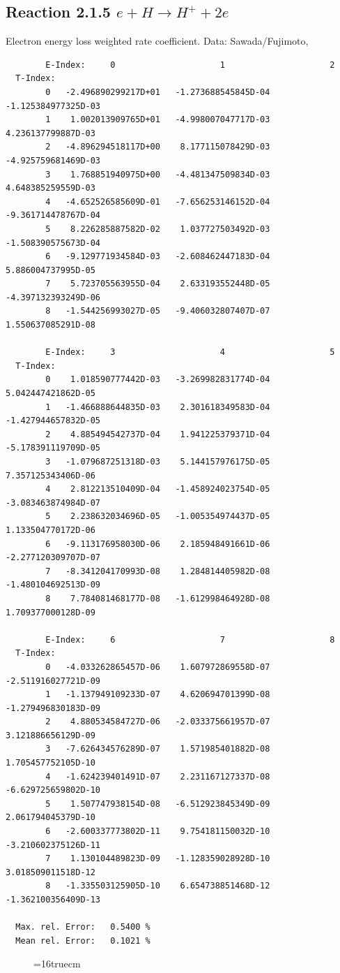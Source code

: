 \documentclass[12pt,dvips]{article}
\begin{document}
\subsection{
Reaction 2.1.5  $ e + H \rightarrow H^+ + 2e $
}
Electron energy loss weighted rate coefficient. Data: Sawada/Fujimoto, \cite{kn:Sawada}

\begin{small}\begin{verbatim}
        E-Index:     0                     1                     2
  T-Index:
        0   -2.496890299217D+01   -1.273688545845D-04   -1.125384977325D-03
        1    1.002013909765D+01   -4.998007047717D-03    4.236137799887D-03
        2   -4.896294518117D+00    8.177115078429D-03   -4.925759681469D-03
        3    1.768851940975D+00   -4.481347509834D-03    4.648385259559D-03
        4   -4.652526585609D-01   -7.656253146152D-04   -9.361714478767D-04
        5    8.226285887582D-02    1.037727503492D-03   -1.508390575673D-04
        6   -9.129771934584D-03   -2.608462447183D-04    5.886004737995D-05
        7    5.723705563955D-04    2.633193552448D-05   -4.397132393249D-06
        8   -1.544256993027D-05   -9.406032807407D-07    1.550637085291D-08

        E-Index:     3                     4                     5
  T-Index:
        0    1.018590777442D-03   -3.269982831774D-04    5.042447421862D-05
        1   -1.466888644835D-03    2.301618349583D-04   -1.427944657832D-05
        2    4.885494542737D-04    1.941225379371D-04   -5.178391119709D-05
        3   -1.079687251318D-03    5.144157976175D-05    7.357125343406D-06
        4    2.812213510409D-04   -1.458924023754D-05   -3.083463874984D-07
        5    2.238632034696D-05   -1.005354974437D-05    1.133504770172D-06
        6   -9.113176958030D-06    2.185948491661D-06   -2.277120309707D-07
        7   -8.341204170993D-08    1.284814405982D-08   -1.480104692513D-09
        8    7.784081468177D-08   -1.612998464928D-08    1.709377000128D-09

        E-Index:     6                     7                     8
  T-Index:
        0   -4.033262865457D-06    1.607972869558D-07   -2.511916027721D-09
        1   -1.137949109233D-07    4.620694701399D-08   -1.279496830183D-09
        2    4.880534584727D-06   -2.033375661957D-07    3.121886656129D-09
        3   -7.626434576289D-07    1.571985401882D-08    1.705457752105D-10
        4   -1.624239401491D-07    2.231167127337D-08   -6.629725659802D-10
        5    1.507747938154D-08   -6.512923845349D-09    2.061794045379D-10
        6   -2.600337773802D-11    9.754181150032D-10   -3.210602375126D-11
        7    1.130104489823D-09   -1.128359028928D-10    3.018509011518D-12
        8   -1.335503125905D-10    6.654738851468D-12   -1.362100356409D-13

  Max. rel. Error:   0.5400 %
  Mean rel. Error:   0.1021 %

\end{verbatim}\end{small}
\begin{figure} \label{2.1.5iFU}
\epsfxsize=16truecm
\end{figure}
\newpage
\end{document}
